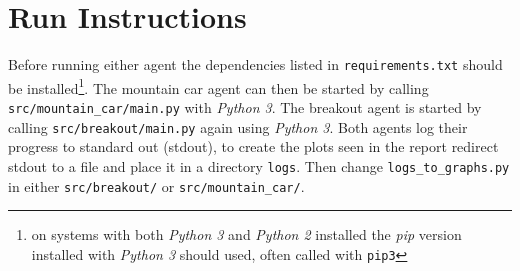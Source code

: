 \section{Run Instructions}
\label{sec:run_instructions}
Before running either agent the dependencies listed in \texttt{requirements.txt} should be installed\footnote{on systems with both \textit{Python 3} and \textit{Python 2} installed the \textit{pip} version installed with \textit{Python 3} should used, often called with \texttt{pip3}}.%
%
The mountain car agent can then be started by calling \texttt{src/mountain\_car/main.py} with \textit{Python 3}. The breakout agent is started by calling \texttt{src/breakout/main.py} again using \textit{Python 3}. Both agents log their progress to standard out (stdout), to create the plots seen in the report redirect stdout to a file and place it in a directory \texttt{logs}. Then change \texttt{logs\_to\_graphs.py} in either \texttt{src/breakout/} or \texttt{src/mountain\_car/}.